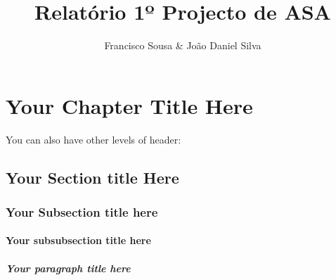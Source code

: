 \documentclass[11pt,a4paper]{report}
\author{Francisco Sousa \& João Daniel Silva}
\title{Relatório 1º Projecto de ASA}
\begin{document}
\maketitle

\chapter{Your Chapter Title Here}
You can also have other levels of header:

\section{Your Section title Here}
\subsection{Your Subsection title here}
\subsubsection{Your subsubsection title here}
\paragraph{Your paragraph title here}
\end{document}
